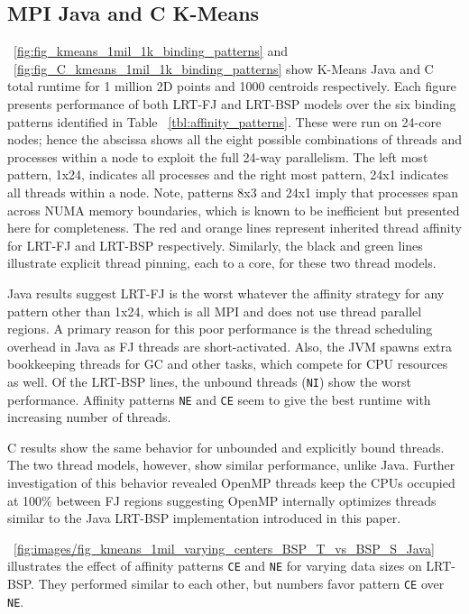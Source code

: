 \documentclass[10pt, conference, compsocconf]{IEEEtran}
\begin{document}
\subsection{MPI Java and C K-Means}
\figurename~\ref{fig:fig_kmeans_1mil_1k_binding_patterns} and \figurename~\ref{fig:fig_C_kmeans_1mil_1k_binding_patterns} show K-Means Java and C total runtime for 1 million 2D points and 1000 centroids respectively. Each figure presents performance of both \ac{LRT-FJ} and \ac{LRT-BSP} models over the six binding patterns identified in Table ~\ref{tbl:affinity_patterns}. These were run on 24-core nodes; hence the abscissa shows all the eight possible combinations of threads and processes within a node to exploit the full 24-way parallelism. The left most pattern, 1x24, indicates all processes and the right most pattern, 24x1 indicates all threads within a node. Note, patterns 8x3 and 24x1 imply that processes span across \ac{NUMA} memory boundaries, which is known to be inefficient but presented here for completeness. The red and orange lines represent inherited thread affinity for \ac{LRT-FJ} and \ac{LRT-BSP} respectively. Similarly, the black and green lines illustrate explicit thread pinning, each to a core, for these two thread models. 

Java results suggest \ac{LRT-FJ} is the worst whatever the affinity strategy for any pattern other than 1x24, which is all \ac{MPI} and does not use thread parallel regions. A primary reason for this poor performance is the thread scheduling overhead in Java as \ac{FJ} threads are short-activated. Also, the \ac{JVM} spawns extra bookkeeping threads for \ac{GC} and other tasks, which compete for \acs{CPU} resources as well. Of the \ac{LRT-BSP} lines, the unbound threads (\texttt{NI}) show the worst performance. Affinity patterns \texttt{NE} and \texttt{CE} seem to give the best runtime with increasing number of threads. 

C results show the same behavior for unbounded and explicitly bound threads. The two thread models, however, show similar performance, unlike Java. Further investigation of this behavior revealed OpenMP threads keep the \acsp{CPU} occupied at 100\% between \ac{FJ} regions suggesting OpenMP internally optimizes threads similar to the Java \ac{LRT-BSP} implementation introduced in this paper.

\figurename~\ref{fig:images/fig_kmeans_1mil_varying_centers_BSP_T_vs_BSP_S_Java} illustrates the effect of affinity patterns \texttt{CE} and \texttt{NE} for varying data sizes on \ac{LRT-BSP}. They performed similar to each other, but numbers favor pattern \texttt{CE} over \texttt{NE}.
\end{document}
